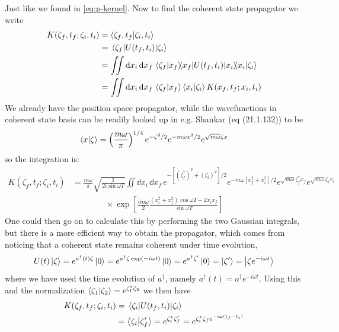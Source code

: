 \documentclass[a4paper,11pt]{article}
\begin{document}
Just like we found in \eqref{eq:p-kernel}.
Now to find the coherent state propagator we write
\begin{equation}
\begin{aligned}
K(\zeta_f,t_f;\zeta_i,t_i)&=\braket{\zeta_f,t_f}{\zeta_i,t_i}\\
&=\mel{\zeta_f}{U(t_f,t_i)}{\zeta_i}\\
&=\iint \dd x_i\, \dd x_f \,\braket{\zeta_f}{x_f}\hspace*{-0.2cm}\mel{x_f}{U(t_f,t_i)}{x_i}\hspace*{-0.15cm}\braket{x_i}{\zeta_i}\\
&=\iint \dd x_i\, \dd x_f \,\braket{\zeta_f}{x_f}\braket{x_i}{\zeta_i}K(x_f,t_f;x_i,t_i)
\end{aligned}
\end{equation}
We already have the position space propagator, while the wavefunctions in coherent state basis can be readily looked up in e.g. Shankar (eq (21.1.132)) to be
\begin{equation}
\braket{x}{\zeta}=\left(\frac{m\omega}{\pi}\right)^{1/4}e^{-\zeta ^2/2}e^{-m\omega x^2/2}e^{\sqrt{m\omega} \zeta x}
\end{equation}
so the integration is:
\begin{equation}
	\begin{aligned}
		K(\zeta_f,t_f;\zeta_i,t_i)
		&=\frac{m\omega}{\pi}\sqrt{\frac{1}{2i\sin{\omega T}}}\iint \dd x_i\, \dd x_f \,e^{-[(\zeta_f^*)^2+(\zeta_i) ^2] /2}e^{-m\omega [x_f^2+x_i^2]/2}e^{\sqrt{m\omega} \zeta^*_f x_f}e^{\sqrt{m\omega} \zeta_i x_i}\\
		&\qquad\qquad\times\exp[\frac{i m \omega}{2 }\frac{(x_i^2+x_f^2)\cos{\omega T}-2x_i x_f}{\sin{\omega T}}]
	\end{aligned}
\end{equation}
One could then go on to calculate this by performing the two Gaussian integrals, but there is a more efficient way to obtain the propagator, which comes from noticing that a coherent state remains coherent under time evolution,
\begin{equation}
U(t)\ket{\zeta}=e^{a^\dagger(t) \zeta}\ket{0}=e^{a^\dagger \zeta \exp(-i\omega t)}\ket{0}=e^{a^\dagger \zeta' }\ket{0}=\ket{\zeta'}=\ket{\zeta e^{-i\omega t}}
\end{equation}
where we have used the time evolution of $a^\dagger$, namely $a^\dagger (t)=a^\dagger e^{-i\omega t}$. Using this and the normalization $\braket{\zeta_1}{\zeta_2}=e^{\zeta_1^*\zeta_2}$ we then have
\begin{equation}
\begin{aligned}
K(\zeta_f,t_f;\zeta_i,t_i)&=\mel{\zeta_i}{U(t_f,t_i)}{\zeta_i}\\
&=\braket{\zeta_i}{\zeta_f'}=e^{\zeta_i^*\zeta_f'}=e^{\zeta_i^*\zeta_fe^{-i\omega(t_f-t_i)}}
\end{aligned}
\end{equation}
\newpage
\end{document}
